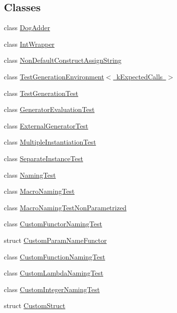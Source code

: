 \subsection*{Classes}
\begin{DoxyCompactItemize}
\item 
class \mbox{\hyperlink{class_dog_adder}{Dog\+Adder}}
\item 
class \mbox{\hyperlink{class_int_wrapper}{Int\+Wrapper}}
\item 
class \mbox{\hyperlink{class_non_default_construct_assign_string}{Non\+Default\+Construct\+Assign\+String}}
\item 
class \mbox{\hyperlink{class_test_generation_environment}{Test\+Generation\+Environment$<$ k\+Expected\+Calls $>$}}
\item 
class \mbox{\hyperlink{class_test_generation_test}{Test\+Generation\+Test}}
\item 
class \mbox{\hyperlink{class_generator_evaluation_test}{Generator\+Evaluation\+Test}}
\item 
class \mbox{\hyperlink{class_external_generator_test}{External\+Generator\+Test}}
\item 
class \mbox{\hyperlink{class_multiple_instantiation_test}{Multiple\+Instantiation\+Test}}
\item 
class \mbox{\hyperlink{class_separate_instance_test}{Separate\+Instance\+Test}}
\item 
class \mbox{\hyperlink{class_naming_test}{Naming\+Test}}
\item 
class \mbox{\hyperlink{class_macro_naming_test}{Macro\+Naming\+Test}}
\item 
class \mbox{\hyperlink{class_macro_naming_test_non_parametrized}{Macro\+Naming\+Test\+Non\+Parametrized}}
\item 
class \mbox{\hyperlink{class_custom_functor_naming_test}{Custom\+Functor\+Naming\+Test}}
\item 
struct \mbox{\hyperlink{struct_custom_param_name_functor}{Custom\+Param\+Name\+Functor}}
\item 
class \mbox{\hyperlink{class_custom_function_naming_test}{Custom\+Function\+Naming\+Test}}
\item 
class \mbox{\hyperlink{class_custom_lambda_naming_test}{Custom\+Lambda\+Naming\+Test}}
\item 
class \mbox{\hyperlink{class_custom_integer_naming_test}{Custom\+Integer\+Naming\+Test}}
\item 
struct \mbox{\hyperlink{struct_custom_struct}{Custom\+Struct}}
\item 

\end{DoxyCompactItemize}
